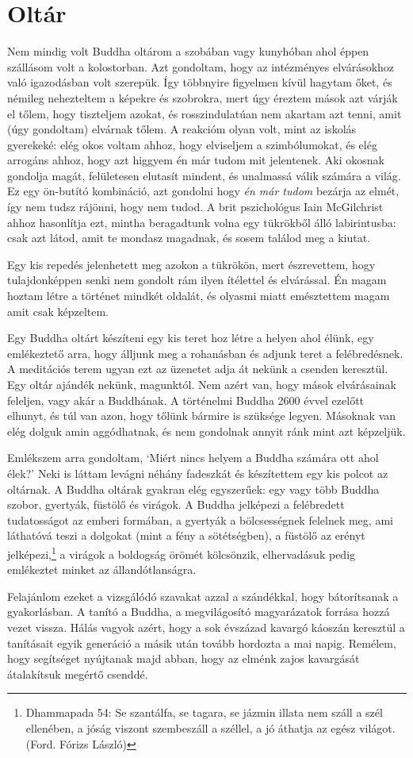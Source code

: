 \section{Oltár}

Nem mindig volt Buddha oltárom a szobában vagy kunyhóban ahol éppen
szállásom volt a kolostorban. Azt gondoltam, hogy az intézményes
elvárásokhoz való igazodásban volt szerepük. Így többnyire figyelmen
kívül hagytam őket, és némileg nehezteltem a képekre és szobrokra, mert
úgy éreztem mások azt várják el tőlem, hogy tiszteljem azokat, és
rosszindulatúan nem akartam azt tenni, amit (úgy gondoltam) elvárnak
tőlem. A reakcióm olyan volt, mint az iskolás gyerekeké: elég okos
voltam ahhoz, hogy elviseljem a szimbólumokat, és elég arrogáns ahhoz,
hogy azt higgyem én már tudom mit jelentenek. Aki okosnak gondolja
magát, felületesen elutasít mindent, és unalmassá válik számára a világ.
Ez egy ön-butító kombináció, azt gondolni hogy \emph{én már tudom}
bezárja az elmét, így nem tudsz rájönni, hogy nem tudod. A brit
pszichológus Iain McGilchrist ahhoz hasonlítja ezt, mintha beragadtunk
volna egy tükrökből álló labirintusba: csak azt látod, amit te mondasz
magadnak, és sosem találod meg a kiutat.

Egy kis repedés jelenhetett meg azokon a tükrökön, mert észrevettem,
hogy tulajdonképpen senki nem gondolt rám ilyen ítélettel és elvárással.
Én magam hoztam létre a történet mindkét oldalát, és olyasmi miatt
emésztettem magam amit csak képzeltem.

Egy Buddha oltárt készíteni egy kis teret hoz létre a helyen ahol élünk,
egy emlékeztető arra, hogy álljunk meg a rohanásban és adjunk teret a
felébredésnek. A meditációs terem ugyan ezt az üzenetet adja át nekünk a
csenden keresztül. Egy oltár ajándék nekünk, magunktól. Nem azért van,
hogy mások elvárásainak feleljen, vagy akár a Buddhának. A történelmi
Buddha 2600 évvel ezelőtt elhunyt, és túl van azon, hogy tőlünk bármire
is szüksége legyen. Másoknak van elég dolguk amin aggódhatnak, és nem
gondolnak annyit ránk mint azt képzeljük.

Emlékszem arra gondoltam, `Miért nincs helyem a Buddha számára ott ahol
élek?' Neki is láttam levágni néhány fadeszkát és készítettem egy kis
polcot az oltárnak. A Buddha oltárak gyakran elég egyszerűek: egy vagy
több Buddha szobor, gyertyák, füstölő és virágok. A Buddha jelképezi a
felébredett tudatosságot az emberi formában, a gyertyák a bölcsességnek
felelnek meg, ami láthatóvá teszi a dolgokat (mint a fény a
sötétségben), a füstölő az erényt jelképezi,\footnote{Dhammapada 54: Se
  szantálfa, se tagara, se jázmin illata nem száll a szél ellenében, a
  jóság viszont szembeszáll a széllel, a jó áthatja az egész világot.
  (Ford. Fórizs László)} a virágok a boldogság örömét kölcsönzik,
elhervadásuk pedig emlékeztet minket az állandótlanságra.

Felajánlom ezeket a vizsgálódó szavakat azzal a szándékkal, hogy
bátorítsanak a gyakorlásban. A tanító a Buddha, a megvilágosító
magyarázatok forrása hozzá vezet vissza. Hálás vagyok azért, hogy a sok
évszázad kavargó káoszán keresztül a tanításait egyik generáció a másik
után tovább hordozta a mai napig. Remélem, hogy segítséget nyújtanak
majd abban, hogy az elménk zajos kavargását átalakítsuk megértő csenddé.
